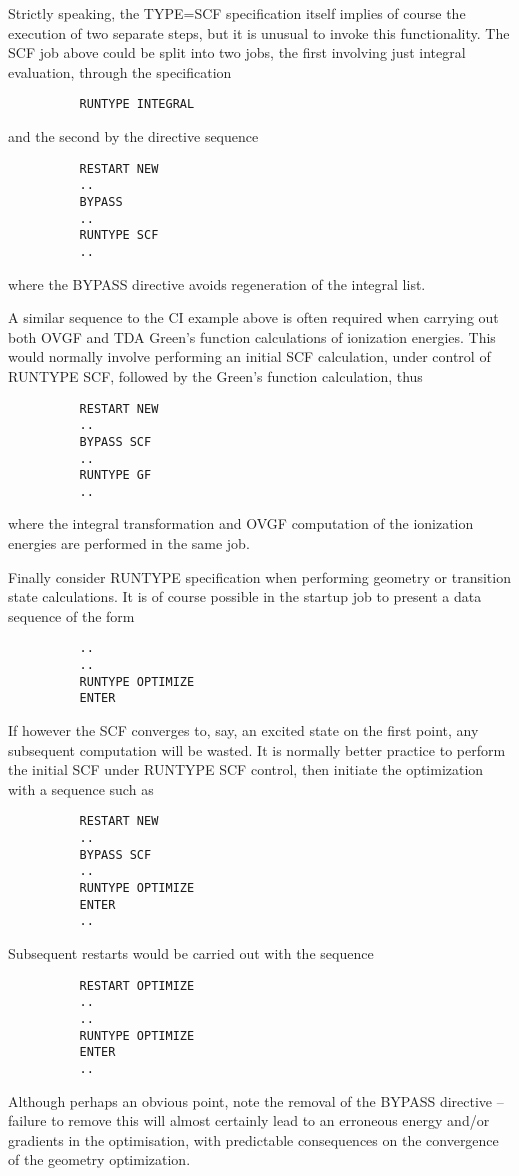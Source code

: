 \documentclass[11pt,fleqn]{article}
\begin{document}
Strictly speaking, the TYPE=SCF specification itself implies of course
the execution of two separate steps, but it is unusual to invoke
this functionality. The SCF job above could be split into two
jobs, the first involving just integral evaluation, through the
specification

{
\footnotesize
\begin{verbatim}
          RUNTYPE INTEGRAL
\end{verbatim}
}
and the second by the directive sequence
{
\footnotesize
\begin{verbatim}
          RESTART NEW
          ..
          BYPASS 
          ..
          RUNTYPE SCF
          ..
\end{verbatim}
}
where the BYPASS directive avoids regeneration of the integral list.


A similar sequence to the CI example above 
is often required when carrying out both
OVGF and TDA Green's function calculations of ionization energies.
This would normally involve performing an initial SCF 
calculation, under control of RUNTYPE SCF, followed by the
Green's function calculation, thus

{
\footnotesize
\begin{verbatim}
          RESTART NEW
          ..
          BYPASS SCF
          ..
          RUNTYPE GF
          ..
\end{verbatim}
}
where the integral transformation and OVGF computation of the
ionization energies are performed in the same job.

Finally consider RUNTYPE specification when performing geometry or
transition state calculations. It is of course possible in the startup
job to present a data sequence of the form

{
\footnotesize
\begin{verbatim}
          ..
          ..
          RUNTYPE OPTIMIZE
          ENTER
\end{verbatim}
}
If however the SCF converges to, say, an excited state
on the first point, any subsequent computation will be wasted. It
is normally better practice to perform the initial SCF under
RUNTYPE SCF control, then initiate the optimization with a sequence
such as

{
\footnotesize
\begin{verbatim}
          RESTART NEW
          ..
          BYPASS SCF
          ..
          RUNTYPE OPTIMIZE
          ENTER
          ..
\end{verbatim}
}
Subsequent restarts would be carried out with the sequence
{
\footnotesize
\begin{verbatim}
          RESTART OPTIMIZE
          ..
          ..
          RUNTYPE OPTIMIZE
          ENTER
          ..
\end{verbatim}
}
Although perhaps an obvious point, note the removal of the BYPASS
directive -- failure to remove this will almost certainly lead to an
erroneous  energy and/or gradients in the optimisation, with predictable
consequences on the convergence of the geometry optimization.
\end{document}

